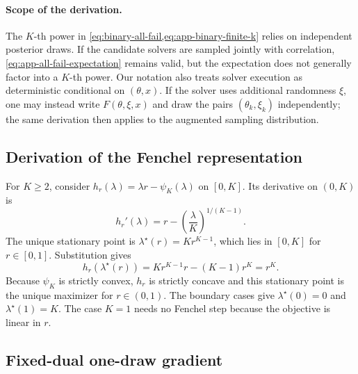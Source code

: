 \paragraph{Scope of the derivation.}
The $K$-th power in \cref{eq:binary-all-fail,eq:app-binary-finite-k} relies on independent posterior draws.
If the candidate solvers are sampled jointly with correlation, \cref{eq:app-all-fail-expectation} remains valid, but the expectation does not generally factor into a $K$-th power.
Our notation also treats solver execution as deterministic conditional on $(\theta,x)$.
If the solver uses additional randomness $\xi$, one may instead write $F(\theta,\xi,x)$ and draw the pairs $(\theta_k,\xi_k)$ independently; the same derivation then applies to the augmented sampling distribution.

\subsection{Derivation of the Fenchel representation}
\label{app:fenchel-proof}

For $K\geq2$, consider $h_r(\lambda)=\lambda r-\psi_K(\lambda)$ on $[0,K]$.
Its derivative on $(0,K)$ is
\begin{equation}
  h_r'(\lambda)
  =
  r-\left(\frac{\lambda}{K}\right)^{1/(K-1)}.
  \label{eq:app-fenchel-derivative}
\end{equation}
The unique stationary point is $\lambda^\star(r)=Kr^{K-1}$, which lies in $[0,K]$ for $r\in[0,1]$.
Substitution gives
\begin{equation}
  h_r(\lambda^\star(r))
  =
  Kr^{K-1}r-(K-1)r^K
  =
  r^K.
  \label{eq:app-fenchel-substitution}
\end{equation}
Because $\psi_K$ is strictly convex, $h_r$ is strictly concave and this stationary point is the unique maximizer for $r\in(0,1)$.
The boundary cases give $\lambda^\star(0)=0$ and $\lambda^\star(1)=K$.
The case $K=1$ needs no Fenchel step because the objective is linear in $r$.

\subsection{Fixed-dual one-draw gradient}
\label{app:fixed-dual-gradient}

